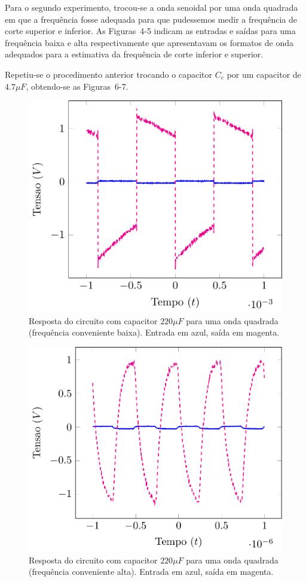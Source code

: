 \documentclass[12pt,a4paper]{article}
\begin{document}
Para o segundo experimento, trocou-se a onda senoidal por uma onda quadrada em que 
a frequência fosse adequada para que pudessemos medir a frequência de corte superior 
e inferior. As Figuras~4-5 indicam as entradas e saídas para uma frequência baixa 
e alta respectivamente que apresentavam os formatos de onda adequados para a estimativa
da frequência de corte inferior e superior. 

Repetiu-se o procedimento anterior trocando o capacitor $C_e$ por um capacitor 
de $4.7\mu F$, obtendo-se as Figuras~6-7.

\begin{figure}[htpb]
  \centering
  \includegraphics[width=0.8\linewidth]{img/BaixasFreq200u.pdf}
  \caption{Resposta do circuito com capacitor $220\mu F$ para uma onda quadrada (frequência conveniente baixa). Entrada em azul, saída em magenta.}
  \label{fig:4}
\end{figure}
\begin{figure}[htpb]
  \centering
  \includegraphics[width=0.8\linewidth]{img/AltasFreq220u.pdf}
  \caption{Resposta do circuito com capacitor $220\mu F$ para uma onda quadrada (frequência conveniente alta). Entrada em azul, saída em magenta.}
  \label{fig:5}
\end{figure}
\end{document}
